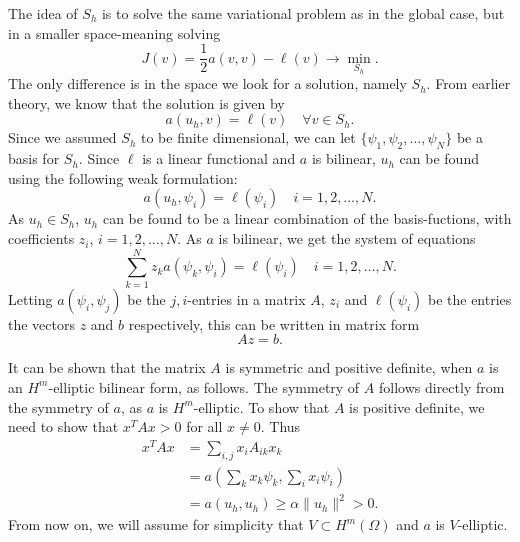 The idea of $S_h$ is to solve the same variational problem as in the global case, 
but in a smaller space-meaning solving
\begin{equation*}
    J(v) = \frac{1}{2}a(v,v) - \ell(v) \to \underset{S_h}{\min}.
\end{equation*}
The only difference is in the space we look for a solution, namely $S_h$. From 
earlier theory, we know that the solution is given by 
\begin{equation*}
    a(u_h,v) = \ell(v) \quad \forall v \in S_h.
\end{equation*}
Since we assumed $S_h$ to be finite dimensional, we can let $ \{ \psi_1, \psi_2, \ldots, \psi_N \}$ 
be a basis for $S_h$. Since $\ell$ is a linear functional and $a$ is bilinear, 
$u_h$ can be found using the following weak formulation:
\begin{equation*}
    a(u_h, \psi_i) = \ell(\psi_i) \quad i = 1, 2, \ldots, N.
\end{equation*}
As $u_h \in S_h$, $u_h$ can be found to be a linear combination of the basis-fuctions, with 
coefficients $z_i$, $i=1, 2, \ldots, N$. As $a$ is bilinear, we get the system of 
equations
\begin{equation*}
    \sum_{k=1}^N z_k a(\psi_k,\psi_i) = \ell(\psi_i) \quad i = 1,2,\ldots,N.
\end{equation*}
Letting $a(\psi_i,\psi_j)$ be the $j,i$-entries in a matrix $A$, $z_i$ and $\ell(\psi_i)$ 
be the entries the vectors $z$ and $b$ respectively, this can be written in matrix form 
\begin{equation*}
    Az = b.
\end{equation*}

It can be shown that the matrix $A$ is symmetric and positive definite, when $a$ is an $H^m$-elliptic bilinear form, as follows. 
The symmetry of $A$ follows directly from the symmetry of $a$, as $a$ is $H^m$-elliptic.
To show that $A$ is positive definite, we need to show that $x^T Ax > 0$ for all $x \neq 0$. Thus
\begin{align*}
    x^T Ax &= \sum_{i,j} x_i A_{ik}x_k \\
    &= a\left(\sum_{k} x_k\psi_k,\sum_{i} x_i\psi_i\right) \\
    &= a(u_h,u_h) \geq \alpha \|u_h\|^2 > 0.
\end{align*}
From now on, we will assume for simplicity that $V\subset H^m(\Omega)$ and $a$ is $V$-elliptic.